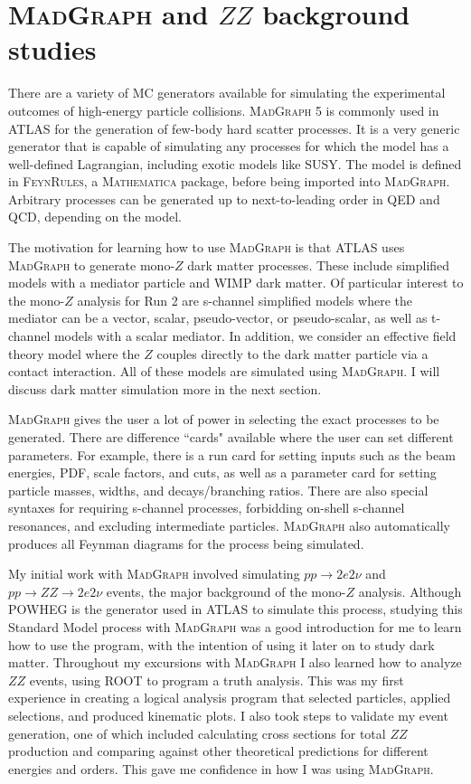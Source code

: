 \section{\textsc{MadGraph} and $ZZ$ background studies}
\label{sec:mg}

There are a variety of MC generators available for simulating the experimental outcomes of high-energy particle collisions. \textsc{MadGraph 5} is commonly used in ATLAS for the generation of few-body hard scatter processes. It is a very generic generator that is capable of simulating any processes for which the model has a well-defined Lagrangian, including exotic models like SUSY. The model is defined in \textsc{FeynRules}, a \textsc{Mathematica} package, before being imported into \textsc{MadGraph}. Arbitrary processes can be generated up to next-to-leading order in QED and QCD, depending on the model.

The motivation for learning how to use \textsc{MadGraph} is that ATLAS uses \textsc{MadGraph} to generate mono-$Z$ dark matter processes. These include simplified models with a mediator particle and WIMP dark matter. Of particular interest to the mono-$Z$ analysis for Run 2 are s-channel simplified models where the mediator can be a vector, scalar, pseudo-vector, or pseudo-scalar, as well as t-channel models with a scalar mediator. In addition, we consider an effective field theory model where the $Z$ couples directly to the dark matter particle via a contact interaction. All of these models are simulated using \textsc{MadGraph}. I will discuss dark matter simulation more in the next section.

\textsc{MadGraph} gives the user a lot of power in selecting the exact processes to be generated. There are difference ``cards" available where the user can set different parameters. For example, there is a run card for setting inputs such as the beam energies, PDF, scale factors, and cuts, as well as a parameter card for setting particle masses, widths, and decays/branching ratios. There are also special syntaxes for requiring s-channel processes, forbidding on-shell s-channel resonances, and excluding intermediate particles. \textsc{MadGraph} also automatically produces all Feynman diagrams for the process being simulated.

My initial work with \textsc{MadGraph} involved simulating $pp \rightarrow 2e2\nu$ and $pp \rightarrow ZZ \rightarrow 2e2\nu$ events, the major background of the mono-$Z$ analysis. Although POWHEG is the generator used in ATLAS to simulate this process, studying this Standard Model process with \textsc{MadGraph} was a good introduction for me to learn how to use the program, with the intention of using it later on to study dark matter. Throughout my excursions with \textsc{MadGraph} I also learned how to analyze $ZZ$ events, using ROOT to program a truth analysis. This was my first experience in creating a logical analysis program that selected particles, applied selections, and produced kinematic plots. I also took steps to validate my event generation, one of which included calculating cross sections for total $ZZ$ production and comparing against other theoretical predictions for different energies and orders. This gave me confidence in how I was using \textsc{MadGraph}.

